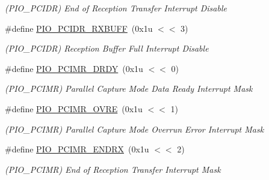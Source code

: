 \begin{DoxyCompactItemize}
\begin{DoxyCompactList}\small\item\em (P\+I\+O\+\_\+\+P\+C\+I\+DR) End of Reception Transfer Interrupt Disable \end{DoxyCompactList}\item 
\mbox{\label{group__SAMV71__PIO_ga994060bd48c7cd20b85a4dd1a624eb4d}} 
\#define \mbox{\hyperlink{group__SAMV71__PIO_ga994060bd48c7cd20b85a4dd1a624eb4d}{P\+I\+O\+\_\+\+P\+C\+I\+D\+R\+\_\+\+R\+X\+B\+U\+FF}}~(0x1u $<$$<$ 3)
\begin{DoxyCompactList}\small\item\em (P\+I\+O\+\_\+\+P\+C\+I\+DR) Reception Buffer Full Interrupt Disable \end{DoxyCompactList}\item 
\mbox{\label{group__SAMV71__PIO_ga03ee08b548c54753bd2186d6f72f5582}} 
\#define \mbox{\hyperlink{group__SAMV71__PIO_ga03ee08b548c54753bd2186d6f72f5582}{P\+I\+O\+\_\+\+P\+C\+I\+M\+R\+\_\+\+D\+R\+DY}}~(0x1u $<$$<$ 0)
\begin{DoxyCompactList}\small\item\em (P\+I\+O\+\_\+\+P\+C\+I\+MR) Parallel Capture Mode Data Ready Interrupt Mask \end{DoxyCompactList}\item 
\mbox{\label{group__SAMV71__PIO_gaad07af8efbc91d85035d14d99941a9c5}} 
\#define \mbox{\hyperlink{group__SAMV71__PIO_gaad07af8efbc91d85035d14d99941a9c5}{P\+I\+O\+\_\+\+P\+C\+I\+M\+R\+\_\+\+O\+V\+RE}}~(0x1u $<$$<$ 1)
\begin{DoxyCompactList}\small\item\em (P\+I\+O\+\_\+\+P\+C\+I\+MR) Parallel Capture Mode Overrun Error Interrupt Mask \end{DoxyCompactList}\item 
\mbox{\label{group__SAMV71__PIO_ga8450087847107517a2c11e93fe1f7717}} 
\#define \mbox{\hyperlink{group__SAMV71__PIO_ga8450087847107517a2c11e93fe1f7717}{P\+I\+O\+\_\+\+P\+C\+I\+M\+R\+\_\+\+E\+N\+D\+RX}}~(0x1u $<$$<$ 2)
\begin{DoxyCompactList}\small\item\em (P\+I\+O\+\_\+\+P\+C\+I\+MR) End of Reception Transfer Interrupt Mask \end{DoxyCompactList}\item 

\end{DoxyCompactItemize}
